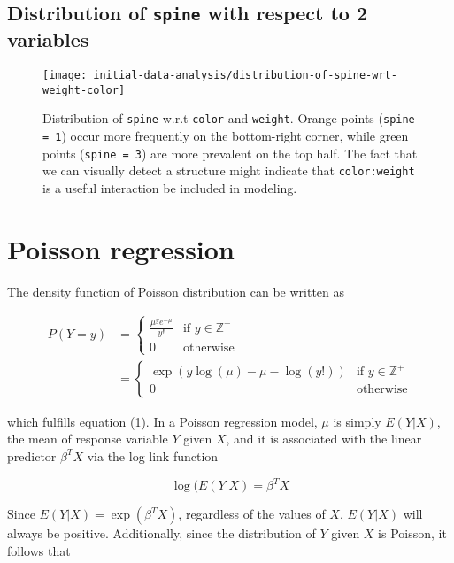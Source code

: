 \documentclass[a4paper, 12pt]{article}
\begin{document}
\subsection{Distribution of \texttt{spine} with respect to 2 variables}
\begin{figure}[H]
\begin{center}
\texttt{[image: initial-data-analysis/distribution-of-spine-wrt-weight-color]}
\caption{Distribution of \texttt{spine} w.r.t \texttt{color} and \texttt{weight}. Orange points (\texttt{spine = 1}) occur more frequently on the bottom-right corner, while green points (\texttt{spine = 3}) are more prevalent on the top half. The fact that we can visually detect a structure might indicate that \texttt{color:weight} is a useful interaction be included in modeling.
}
\label{distribution-of-spine-wrt-2-variables}
\end{center}
\end{figure}

\section{Poisson regression}
\noindent The density function of Poisson distribution can be written as 

\begin{align*}
 P(Y = y) &=
  \begin{cases}
    \frac{\mu^y e^{-\mu} }{y!}        & \text{if } y \in \mathbb{Z^+} \\
   0        & \text{otherwise}
  \end{cases}
  \\
  &=
  \begin{cases}
   \exp(y \log(\mu) - \mu - \log(y!) )& \text{if } y \in \mathbb{Z^+} \\
   0        & \text{otherwise}
  \end{cases}
\end{align*}

\noindent which fulfills equation (1). In a Poisson regression model, $\mu$ is simply $E(Y|X)$, the mean of response variable $Y$ given $X$, and it is associated with the linear predictor $\beta^TX$ via the log link function

$$\log(E(Y|X) = \beta^TX$$

\noindent Since $E(Y|X) = \exp(\beta^TX)$, regardless of the values of $X$, $E(Y|X)$ will always be positive. Additionally, since the distribution of $Y$ given $X$ is Poisson, it follows that 
\end{document}
